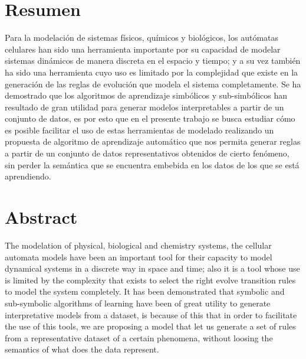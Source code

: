 \pagestyle{plain}
\cleardoublepage
\chapter*{Resumen}
\bigskip
\noindent Para la modelación de sistemas físicos, químicos y biológicos, los autómatas celulares han sido una herramienta importante por su capacidad de modelar sistemas dinámicos de manera discreta en el espacio y tiempo; y a su vez también ha sido una herramienta cuyo uso es limitado por la complejidad que existe en la generación de las reglas de evolución que modela el sistema completamente. Se ha demostrado que los algoritmos de aprendizaje simbólicos y sub-simbólicos han resultado de gran utilidad para generar modelos interpretables a partir de un conjunto de datos, es por esto que en el presente trabajo se busca estudiar cómo es posible facilitar el uso de estas herramientas de modelado realizando un propuesta de algoritmo de aprendizaje automático que nos permita generar reglas a partir de un conjunto de datos representativos obtenidos de cierto fenómeno, sin perder la semántica que se encuentra embebida en los datos de los que se está aprendiendo.

\bigskip
\bigskip
\chapter*{Abstract}
\bigskip
The modelation of physical, biological and chemistry systems, the cellular automata models have been an important tool for their capacity to model dynamical systems in a discrete way in space and time; also it is a tool whose use is limited by the complexity that exists to select the right evolve transition rules to model the system completely. It has been demonstrated that symbolic and sub-symbolic algorithms of learning have been of great utility to generate interpretative models from a dataset, is because of this that in order to facilitate the use of this tools, we are proposing a model that let us generate a set of rules from a representative dataset of a certain phenomena, without loosing the semantics of what does the data represent.
